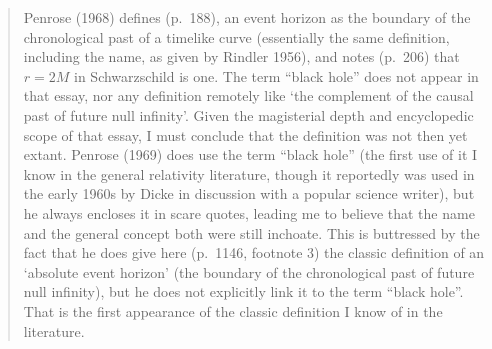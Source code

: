 \documentclass[12pt]{article}
\begin{document}
\begin{quote}
\begin{small}
Penrose (1968) defines (p.\ 188), an event horizon as the boundary of the chronological past of
a timelike curve (essentially the same definition, including the name, as given by Rindler 1956),
and notes (p.\ 206) that $r = 2M$ in Schwarzschild is one. The term ``black hole'' does not appear
in that essay, nor any definition remotely like `the complement of the causal past of future null
infinity'. Given the magisterial depth and encyclopedic scope of that essay, I must conclude that
the definition was not then yet extant. Penrose (1969) does use the term ``black hole'' (the first use
of it I know in the general relativity literature, though it reportedly was used in the early 1960s by
Dicke in discussion with a popular science writer), but he always encloses it in scare quotes, leading
me to believe that the name and the general concept both were still inchoate. This is buttressed
by the fact that he does give here (p.\ 1146, footnote 3) the classic definition of an `absolute event
horizon' (the boundary of the chronological past of future null infinity), but he does not explicitly
link it to the term ``black hole''. That is the first appearance of the classic definition I know of in
the literature.


\end{small}
\end{quote}
\end{document}
